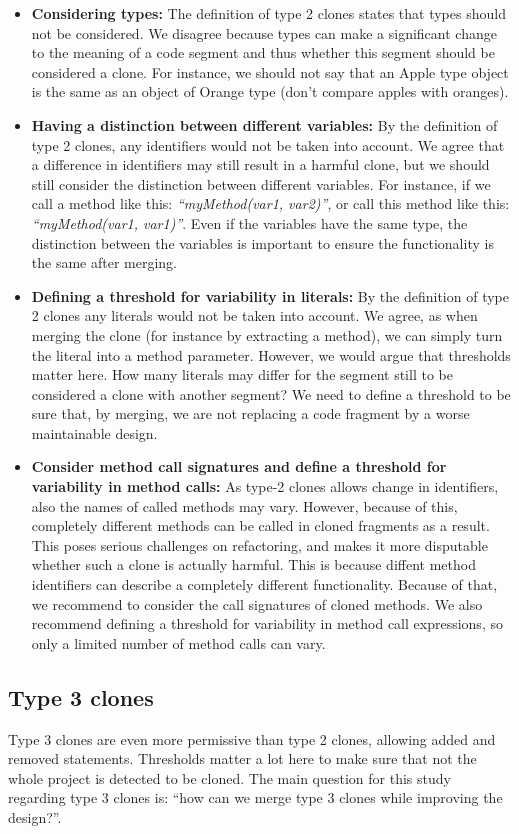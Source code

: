 \documentclass[a4paper]{article}
\begin{document}
\begin{itemize}
  \item \textbf{Considering types:} The definition of type 2 clones states that types should not be considered. We disagree because types can make a significant change to the meaning of a code segment and thus whether this segment should be considered a clone. For instance, we should not say that an Apple type object is the same as an object of Orange type (don't compare apples with oranges).
  \item \textbf{Having a distinction between different variables:} By the definition of type 2 clones, any identifiers would not be taken into account. We agree that a difference in identifiers may still result in a harmful clone, but we should still consider the distinction between different variables. For instance, if we call a method like this: \textit{``myMethod(var1, var2)''}, or call this method like this: \textit{``myMethod(var1, var1)''}. Even if the variables have the same type, the distinction between the variables is important to ensure the functionality is the same after merging.
  \item \textbf{Defining a threshold for variability in literals:} By the definition of type 2 clones any literals would not be taken into account. We agree, as when merging the clone (for instance by extracting a method), we can simply turn the literal into a method parameter. However, we would argue that thresholds matter here. How many literals may differ for the segment still to be considered a clone with another segment? We need to define a threshold to be sure that, by merging, we are not replacing a code fragment by a worse maintainable design.
  \item \textbf{Consider method call signatures and define a threshold for variability in method calls:} As type-2 clones allows change in identifiers, also the names of called methods may vary. However, because of this, completely different methods can be called in cloned fragments as a result. This poses serious challenges on refactoring, and makes it more disputable whether such a clone is actually harmful. This is because diffent method identifiers can describe a completely different functionality. Because of that, we recommend to consider the call signatures of cloned methods. We also recommend defining a threshold for variability in method call expressions, so only a limited number of method calls can vary. 
\end{itemize}

\subsection{Type 3 clones}
Type 3 clones are even more permissive than type 2 clones, allowing added and removed statements. Thresholds matter a lot here to make sure that not the whole project is detected to be cloned. The main question for this study regarding type 3 clones is: ``how can we merge type 3 clones while improving the design?''.
\end{document}
